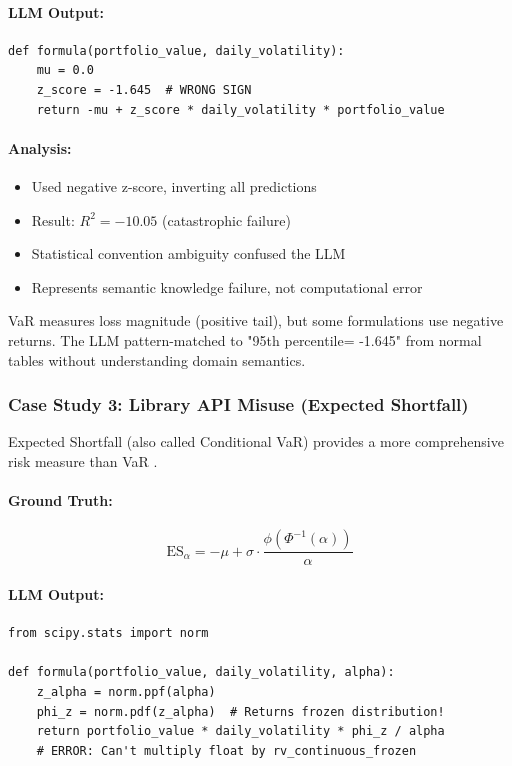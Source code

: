 \documentclass[twoside,11pt]{article}
\begin{document}
\paragraph{LLM Output:}
\begin{verbatim}
def formula(portfolio_value, daily_volatility):
    mu = 0.0
    z_score = -1.645  # WRONG SIGN
    return -mu + z_score * daily_volatility * portfolio_value
\end{verbatim}

\paragraph{Analysis:}
\begin{itemize}
\item Used negative z-score, inverting all predictions
\item Result: $R^2 = -10.05$ (catastrophic failure)
\item Statistical convention ambiguity confused the LLM\citep{kambhampati2024llms}
\item Represents semantic knowledge failure, not computational error
\end{itemize}

VaR measures loss magnitude (positive tail), but some formulations use negative returns. The LLM pattern-matched to "95th percentile= -1.645" from normal tables without understanding domain semantics\citep{kambhampati2024llms}.

\subsubsection{Case Study 3: Library API Misuse (Expected Shortfall)}

Expected Shortfall (also called Conditional VaR) provides a more comprehensive risk measure than VaR \citep{embrechts1997modelling,rockafellar2000optimization}.

\paragraph{Ground Truth:}
\begin{equation}
\text{ES}_{\alpha} = -\mu + \sigma \cdot \frac{\phi(\Phi^{-1}(\alpha))}{\alpha}
\end{equation}

\paragraph{LLM Output:}
\begin{verbatim}
from scipy.stats import norm

def formula(portfolio_value, daily_volatility, alpha):
    z_alpha = norm.ppf(alpha)
    phi_z = norm.pdf(z_alpha)  # Returns frozen distribution!
    return portfolio_value * daily_volatility * phi_z / alpha
    # ERROR: Can't multiply float by rv_continuous_frozen
\end{verbatim}
\end{document}
